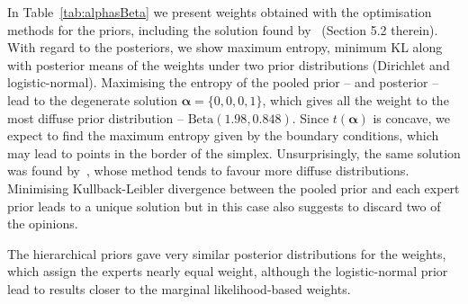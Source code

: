 \documentclass[12pt]{article}
\begin{document}
In Table~\ref{tab:alphasBeta} we present weights obtained with the optimisation methods for the priors, including the solution found by~\textcite{Rufo2012B} (Section 5.2 therein).
With regard to the posteriors, we show maximum entropy, minimum KL along with posterior means of the weights under two prior distributions (Dirichlet and logistic-normal).
Maximising the entropy of the pooled prior -- and posterior -- lead to the degenerate solution $\boldsymbol \alpha = \{0, 0, 0, 1 \}$, which gives all the weight to the most diffuse prior distribution -- $\text{Beta}(1.98, 0.848)$.
Since $t(\boldsymbol\alpha)$ is concave, we expect to find the maximum entropy given by the boundary conditions, which may lead to points in the border of the simplex.
Unsurprisingly, the same solution was found by~\textcite{Rufo2012B}, whose method tends to favour more diffuse distributions.
Minimising Kullback-Leibler divergence between the pooled prior and each expert prior leads to a unique solution but in this case also suggests to discard two of the opinions.

The hierarchical priors gave very similar posterior distributions for the weights, which assign the experts nearly equal weight, although the logistic-normal prior lead to results closer to the marginal likelihood-based weights.
\end{document}
